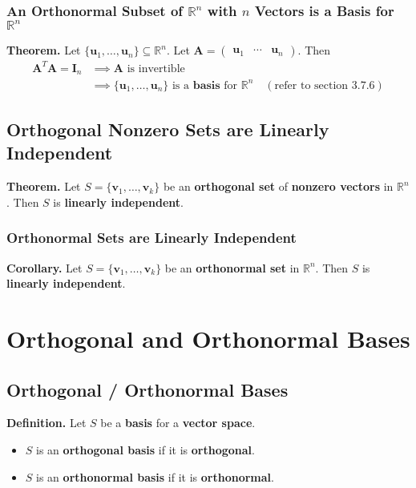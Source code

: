 \documentclass[../ma2001_notes.tex]{subfiles}
\begin{document}
\subsubsection{An Orthonormal Subset of $\mathbb{R}^n$ with $n$ Vectors is a Basis for $\mathbb{R}^n$}
\textbf{Theorem.} Let \(\{\bm{u}_1,\ldots,\bm{u}_n\}\subseteq\mathbb{R}^n\). Let \(\bm{A}=\begin{pmatrix}
	\bm{u}_1 & \cdots & \bm{u}_n
\end{pmatrix}\). Then
\begin{align*}
	\bm{A}^T\bm{A}=\bm{I}_n
	&\implies\bm{A}\text{ is invertible} \\
	&\implies\{\bm{u}_1,\ldots,\bm{u}_n\}\text{ is a }\textbf{basis}\text{ for }\mathbb{R}^n\quad(\text{refer to section 3.7.6})
\end{align*}

\subsection{Orthogonal Nonzero Sets are Linearly Independent}
\textbf{Theorem.} Let \(S=\{\bm{v}_1,\ldots,\bm{v}_k\}\) be an \textbf{orthogonal set} of \textbf{nonzero vectors} in \(\mathbb{R}^n\). Then \(S\) is \textbf{linearly independent}.

\subsubsection{Orthonormal Sets are Linearly Independent}
\textbf{Corollary.} Let \(S=\{\bm{v}_1,\ldots,\bm{v}_k\}\) be an \textbf{orthonormal set} in \(\mathbb{R}^n\). Then \(S\) is \textbf{linearly independent}.

\section{Orthogonal and Orthonormal Bases}
\subsection{Orthogonal / Orthonormal Bases}
\textbf{Definition.} Let \(S\) be a \textbf{basis} for a \textbf{vector space}.
\begin{itemize}
	\item\(S\) is an \textbf{orthogonal basis} if it is \textbf{orthogonal}.
	\item\(S\) is an \textbf{orthonormal basis} if it is \textbf{orthonormal}.
\end{itemize}
\end{document}

